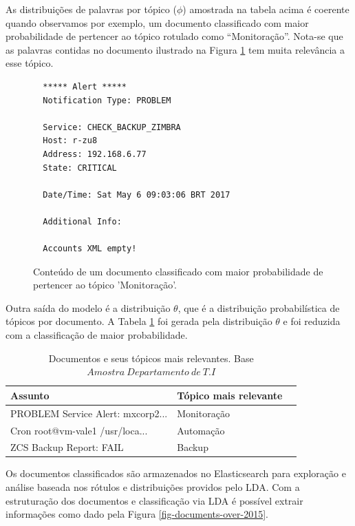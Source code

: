 \documentclass[12pt,a4paper]{article}
\begin{document}
As distribuições de palavras por tópico ($\phi$) amostrada na tabela acima é coerente quando observamos por exemplo, um documento classificado com maior
 probabilidade de pertencer ao tópico rotulado como ``Monitoração''. Nota-se que as palavras contidas no documento ilustrado na Figura \ref{mo} tem muita relevância a esse tópico.


\begin{figure}[H]
  \scriptsize
  \begin{verbatim}
  ***** Alert *****
  Notification Type: PROBLEM

  Service: CHECK_BACKUP_ZIMBRA
  Host: r-zu8
  Address: 192.168.6.77
  State: CRITICAL

  Date/Time: Sat May 6 09:03:06 BRT 2017

  Additional Info:

  Accounts XML empty!
  \end{verbatim}
  \normalsize
  \caption{Conteúdo de um documento classificado com maior probabilidade de pertencer ao tópico 'Monitoração'.}
  \label{mo}
\end{figure}

Outra saída do modelo é a distribuição $\theta$, que é a distribuição probabilística de tópicos por documento. A Tabela \ref{tab-nich-documents2} foi gerada pela distribuição $\theta$ e foi reduzida com a classificação de maior 
 probabilidade.

\begin{table}[H]
  \centering
  \begin{tabular}{lll}
  Assunto                               & Tópico mais relevante \\
  \hline
  PROBLEM Service Alert: mxcorp2...     & Monitoração \\
  Cron root@vm-vale1 /usr/loca...       & Automação \\
  ZCS Backup Report: FAIL               & Backup \\
  \hline
  \end{tabular}
  \caption{Documentos e seus tópicos mais relevantes. Base $Amostra\ Departamento\ de\ T.I$}
  \label{tab-nich-documents2}
\end{table}



Os documentos classificados são armazenados no Elasticsearch para exploração e análise baseada 
 nos rótulos e distribuições providos pelo LDA. Com a estruturação dos documentos e classificação via LDA é possível extrair informações como 
 dado pela Figura \ref{fig-documents-over-2015}.
\end{document}
